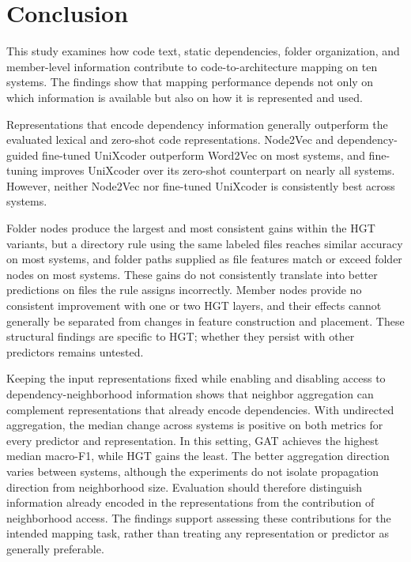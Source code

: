 \section{Conclusion\label{sec:conclusion}}

This study examines how code text, static dependencies, folder organization, and member-level information contribute to code-to-architecture mapping on ten systems. The findings show that mapping performance depends not only on which information is available but also on how it is represented and used.

Representations that encode dependency information generally outperform the evaluated lexical and zero-shot code representations. Node2Vec and dependency-guided fine-tuned UniXcoder outperform Word2Vec on most systems, and fine-tuning improves UniXcoder over its zero-shot counterpart on nearly all systems. However, neither Node2Vec nor fine-tuned UniXcoder is consistently best across systems.

Folder nodes produce the largest and most consistent gains within the HGT variants, but a directory rule using the same labeled files reaches similar accuracy on most systems, and folder paths supplied as file features match or exceed folder nodes on most systems. These gains do not consistently translate into better predictions on files the rule assigns incorrectly. Member nodes provide no consistent improvement with one or two HGT layers, and their effects cannot generally be separated from changes in feature construction and placement. These structural findings are specific to HGT; whether they persist with other predictors remains untested.

Keeping the input representations fixed while enabling and disabling access to dependency-neighborhood information shows that neighbor aggregation can complement representations that already encode dependencies. With undirected aggregation, the median change across systems is positive on both metrics for every predictor and representation. In this setting, GAT achieves the highest median macro-F1, while HGT gains the least. The better aggregation direction varies between systems, although the experiments do not isolate propagation direction from neighborhood size. Evaluation should therefore distinguish information already encoded in the representations from the contribution of neighborhood access. The findings support assessing these contributions for the intended mapping task, rather than treating any representation or predictor as generally preferable.

